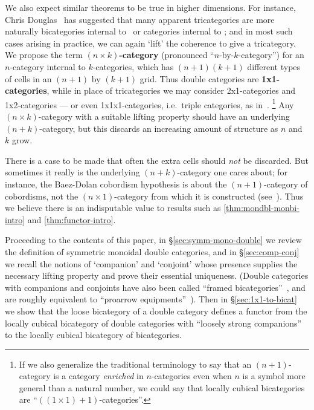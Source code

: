 \begin{rmk}
We also expect similar theorems to be true in higher dimensions.  For
instance, Chris Douglas~\cite{douglas:tfttalk} has suggested that many
apparent tricategories are more naturally bicategories internal to
\cCat\ or categories internal to \cTwocat; and in most such cases
arising in practice, we can again `lift' the coherence to give a
tricategory.
%
We propose the term \textbf{$(n\times k)$-category}
(pronounced ``$n$-by-$k$-category'') for an $n$-category internal to
$k$-categories, which has $(n+1)(k+1)$ different types of
cells in an $(n+1)$ by $(k+1)$ grid.  Thus
double categories are \textbf{1x1-categories}, while in
place of tricategories we may consider 2x1-categories and
1x2-categories --- or even 1x1x1-categories, i.e.\ triple categories,
as in~\cite{gp:intercategories-i,gp:intercategories-ii}.%
\footnote{If we also generalize the traditional terminology to say that an $(n+1)$-category is a category \emph{enriched} in $n$-categories even when $n$ is a symbol more general than a natural number, we could say that locally cubical bicategories are ``$((1\times 1)+1)$-categories''.}
Any
$(n\times k)$-category with a suitable lifting property
should have an underlying $(n+k)$-category, but this discards an increasing amount of structure as $n$ and $k$ grow.


There is a case to be made that often the extra cells should
\emph{not} be discarded.  But sometimes
it really is the underlying $(n+k)$-category one cares about; for
instance, the Baez-Dolan cobordism hypothesis is about the $(n+1)$-category of cobordisms, not
the $(n\times 1)$-category from which it is constructed
(see~\cite{lurie:tft}).  Thus we believe there is an indisputable value to
results such as \autoref{thm:mondbl-monbi-intro} and \autoref{thm:functor-intro}.
\end{rmk}

Proceeding to the contents of this paper, in
\S\ref{sec:symm-mono-double} we review the definition of symmetric
monoidal double categories, and in \S\ref{sec:comp-conj} we recall the
notions of `companion' and `conjoint' whose presence supplies the
necessary lifting property and prove their essential uniqueness.
(Double categories with companions and conjoints have also been called ``framed bicategories''~\cite{shulman:frbi}, and are roughly equivalent to ``proarrow equipments''~\cite{wood:proarrows-i}).
Then in \S\ref{sec:1x1-to-bicat} we show that the loose bicategory of a double category defines a functor from the locally cubical bicategory of double categories with ``loosely strong companions'' to the locally cubical bicategory of bicategories.

